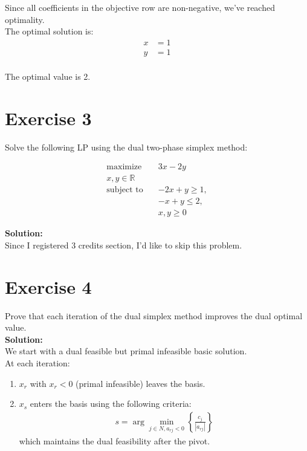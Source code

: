 \documentclass{article}
\begin{document}
Since all coefficients in the objective row are non-negative, we've reached optimality. \\

The optimal solution is:
\begin{align*}
x &= 1\\
y &= 1\\
\end{align*}

The optimal value is 2.

\newpage

\section*{Exercise 3}
Solve the following LP using the dual two-phase simplex method:

\begin{align*}
\text{maximize} \quad & 3x - 2y\\
x, y \in \mathbb{R} \quad & \\
\text{subject to} \quad & -2x + y \geq 1,\\
& -x + y \leq 2,\\
& x, y \geq 0
\end{align*}

\textbf{Solution:} \\

Since I registered 3 credits section, I'd like to skip this problem.

\newpage

\section*{Exercise 4}
Prove that each iteration of the dual simplex method improves the dual optimal value. \\

\textbf{Solution:} \\

We start with a dual feasible but primal infeasible basic solution. \\

At each iteration:
\begin{enumerate}
    \item $x_r$ with $x_r < 0$ (primal infeasible) leaves the basis.
    \item $x_s$ enters the basis using the following criteria:
\begin{align*}
s = \arg\min_{j \in N, a_{rj} < 0} \left\{ \frac{c_j}{|a_{rj}|} \right\}
\end{align*}
which maintains the dual feasibility after the pivot.
\end{enumerate}
\end{document}

